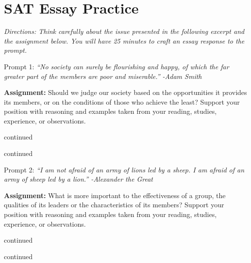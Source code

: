 \section{SAT Essay Practice}
\textit{Directions: Think carefully about the issue presented in the following excerpt and the assignment
below. You will have 25 minutes to craft an essay response to the prompt.}

\medskip
\large{Prompt 1:} \textit{``No society can surely be flourishing and happy, of which the far greater part of the members are poor and miserable.'' -Adam Smith}

\medskip
\large{\bf{Assignment:}} Should we judge our society based on the opportunities it provides its members, or on the conditions of those who achieve the least? Support your position with reasoning and examples taken from your reading, studies, experience, or observations.

\bigskip
\mline[14]

\newpage
continued \mline[16]

\newpage
continued \mline[16]

\newpage
\large{Prompt 2:} \textit{``I am not afraid of an army of lions led by a sheep. I am afraid of an army of sheep led by a lion.'' -Alexander the Great}

\medskip
\large{\bf{Assignment:}} What is more important to the effectiveness of a group, the qualities of its leaders or the characteristics of its members? Support your position with reasoning and examples taken from your reading, studies, experience, or observations.

\bigskip
\mline[16]

\newpage
continued \mline[16]

\newpage
continued \mline[16]